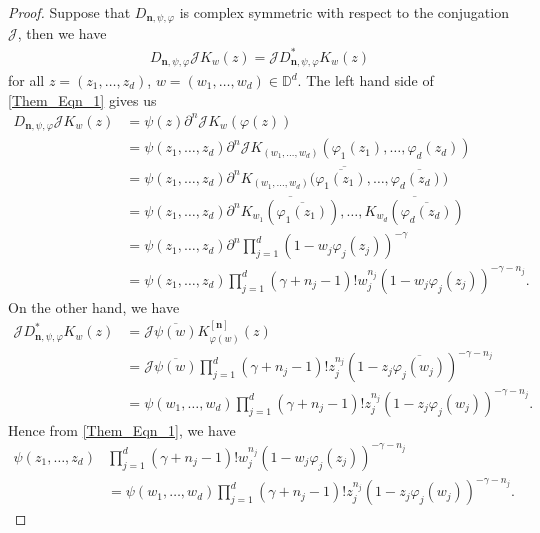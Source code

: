\documentclass[12pt, reqno]{amsart}
\theoremstyle{definition}
\theoremstyle{remark}
\numberwithin{equation}{section}
\newcommand{\mfn}{\mathbf n}
\begin{document}
\begin{proof}
        Suppose that $D_{\mfn,\psi,\varphi}$ is complex symmetric with respect to the conjugation $\mathcal{J}$, then we have
    \begin{align}\label{Them_Eqn_1}
         D_{\mfn,\psi, \varphi}\mathcal{J}K_w(z)= \mathcal{J}D_{\mfn,\psi, \varphi}^*K_w(z)
    \end{align}
    for all $z=(z_1, \dots, z_d)$, $w=(w_1, \dots, w_d)\in \mathbb{D}^d$.
    The left hand side of \eqref{Them_Eqn_1} gives us 
    \begin{align}\label{Them_Eqn_2}
         D_{\mfn,\psi, \varphi}\mathcal{J}K_w(z)&=\psi(z)\partial^n\mathcal{J}K_w(\varphi(z))\nonumber\\
         &=\psi(z_1, \dots, z_d)\partial^n\mathcal{J}K_{(w_1, \dots, w_d)}(\varphi_1(z_1), \dots, \varphi_d(z_d))\nonumber\\
         &=\psi(z_1, \dots, z_d)\partial^n\overline{K_{(w_1, \dots, w_d)}(\overline{\varphi_1(z_1)}, \dots, \overline{\varphi_d(z_d))}}\nonumber\\
          &=\psi(z_1, \dots, z_d)\partial^n\overline{K_{w_1}(\overline{\varphi_1(z_1)})},\dots, \overline{K_{w_d}(\overline{\varphi_d(z_d)})}\nonumber\\
           &=\psi(z_1, \dots, z_d)\partial^n\prod_{j=1}^d(1-w_j\varphi_j(z_j))^{-\gamma}\nonumber\\
            &=\psi(z_1, \dots, z_d)\prod_{j=1}^d(\gamma+n_j-1)!w_j^{n_j}(1-w_j\varphi_j(z_j))^{-\gamma-n_j}.
    \end{align}
    On the other hand, we have 
    \begin{align}\label{Them_Eqn_3}
    	\mathcal{J} D_{\mfn,\psi, \varphi}^*K_w(z)&=\mathcal{J}\overline{\psi(w)}K_{\varphi(w)}^{[\mfn]}(z)\nonumber\\
    	&=\mathcal{J}\overline{\psi(w)}\prod_{j=1}^d(\gamma+n_j-1)!z_j^{n_j}(1-z_j\overline{\varphi_j(w_j)})^{-\gamma-n_j}\nonumber\\
    	&=\psi(w_1, \dots, w_d)\prod_{j=1}^d(\gamma+n_j-1)!z_j^{n_j}(1-z_j\varphi_j(w_j))^{-\gamma-n_j}.
    \end{align}
    Hence from \eqref{Them_Eqn_1}, we have 
    \begin{align}\label{Them_Eqn_4}
    \psi(z_1, \dots, z_d)&\prod_{j=1}^d(\gamma+n_j-1)!w_j^{n_j}(1-w_j\varphi_j(z_j))^{-\gamma-n_j}\nonumber\\
    &=\psi(w_1, \dots, w_d)\prod_{j=1}^d(\gamma+n_j-1)!z_j^{n_j}(1-z_j\varphi_j(w_j))^{-\gamma-n_j}.
    \end{align}

\end{proof}
\end{document}
